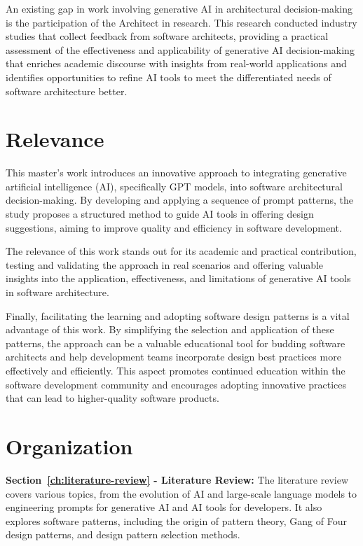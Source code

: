 An existing gap in work involving generative AI in architectural decision-making is the participation of the Architect in research. This research conducted industry studies that collect feedback from software architects, providing a practical assessment of the effectiveness and applicability of generative AI decision-making that enriches academic discourse with insights from real-world applications and identifies opportunities to refine AI tools to meet the differentiated needs of software architecture better.

\section{Relevance}\label{sec:relevance}
This master's work introduces an innovative approach to integrating generative artificial intelligence (AI), specifically GPT models, into software architectural decision-making. By developing and applying a sequence of prompt patterns, the study proposes a structured method to guide AI tools in offering design suggestions, aiming to improve quality and efficiency in software development.

The relevance of this work stands out for its academic and practical contribution, testing and validating the approach in real scenarios and offering valuable insights into the application, effectiveness, and limitations of generative AI tools in software architecture.

Finally, facilitating the learning and adopting software design patterns is a vital advantage of this work. By simplifying the selection and application of these patterns, the approach can be a valuable educational tool for budding software architects and help development teams incorporate design best practices more effectively and efficiently. This aspect promotes continued education within the software development community and encourages adopting innovative practices that can lead to higher-quality software products.

\section{Organization}\label{sec:organization}


\textbf{Section~\ref{ch:literature-review} - Literature Review: }
The literature review covers various topics, from the evolution of AI and large-scale language models to engineering prompts for generative AI and AI tools for developers. It also explores software patterns, including the origin of pattern theory, Gang of Four design patterns, and design pattern selection methods.

